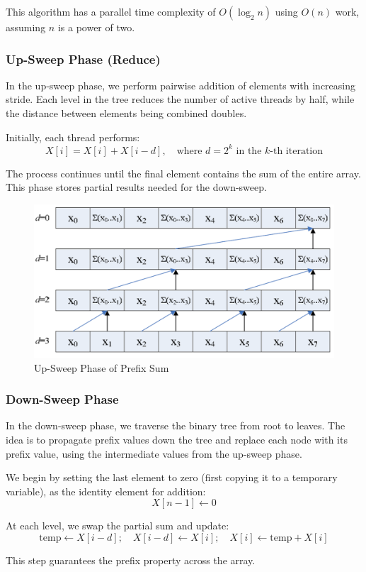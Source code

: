 \documentclass[12pt]{book}
\begin{document}
This algorithm has a parallel time complexity of $O(\log_2 n)$ using $O(n)$ work, assuming $n$ is a power of two.

\subsubsection{Up-Sweep Phase (Reduce)}
In the up-sweep phase, we perform pairwise addition of elements with increasing stride. Each level in the tree reduces the number of active threads by half, while the distance between elements being combined doubles.

Initially, each thread performs:
\[
X[i] = X[i] + X[i - d], \quad \text{where } d = 2^k \text{ in the $k$-th iteration}
\]

The process continues until the final element contains the sum of the entire array. This phase stores partial results needed for the down-sweep.

\begin{figure}[H]
    \centering
    \includegraphics[width=0.6\linewidth]{images/upsweep.png}
    \caption{Up-Sweep Phase of Prefix Sum}
    \label{fig:upsweep}
\end{figure}

\subsubsection{Down-Sweep Phase}
In the down-sweep phase, we traverse the binary tree from root to leaves. The idea is to propagate prefix values down the tree and replace each node with its prefix value, using the intermediate values from the up-sweep phase.

We begin by setting the last element to zero (first copying it to a temporary variable), as the identity element for addition:
\[
X[n - 1] \gets 0
\]

At each level, we swap the partial sum and update:
\[
\text{temp} \gets X[i - d]; \quad X[i - d] \gets X[i]; \quad X[i] \gets \text{temp} + X[i]
\]

This step guarantees the prefix property across the array.
\end{document}
